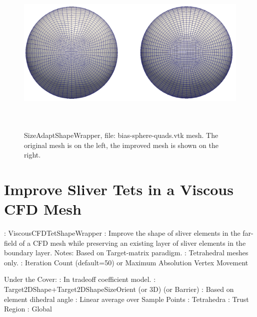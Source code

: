 \begin{figure}[htbp]
\begin{center}
    \includegraphics[height=80mm]{bias-sphere-quads.eps}
    \caption{SizeAdaptShapeWrapper, file: bias-sphere-quads.vtk mesh. The original mesh is on the left, the improved mesh is shown on the right.}
    \label{fig:shest_grid32}
\end{center}
\end{figure}

\newpage

\section{Improve Sliver Tets in a Viscous CFD Mesh} \label{sec:ViscousCFDTetShapeWrapper}

: ViscousCFDTetShapeWrapper \newline
{}: Improve the shape of sliver elements in the far-field 
of a CFD mesh while 
preserving an existing layer of sliver elements in the boundary layer. \newline
\noindent Notes: Based on Target-matrix paradigm.  \newline
{}: Tetrahedral meshes only.  \newline 
{}: Iteration Count (default=50) or Maximum Absolution Vertex Movement \newline \newline
 
\noindent Under the Cover: \newline
{}: In tradeoff coefficient model. \newline
{}: Target2DShape+Target2DShapeSizeOrient (or 3D) (or Barrier) \newline
{}: Based on element dihedral angle \newline
{}: Linear average over Sample Points \newline
{}: Tetrahedra \newline
{}: Trust Region \newline
{}: Global \newline


